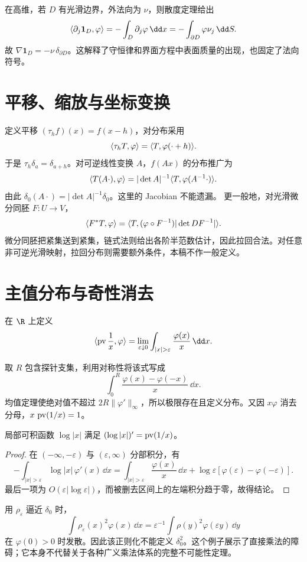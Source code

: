 在高维，若 $D$ 有光滑边界，外法向为 $\nu$，则散度定理给出
\[
 \Pair{\partial_j\mathbf1_D}{\varphi}
 =-\int_D\partial_j\varphi\,\dd x
 =-\int_{\partial D}\varphi\nu_j\,\dd S.
\]
故 $\nabla\mathbf1_D=-\nu\,\delta_{\partial D}$。这解释了守恒律和界面方程中表面质量的出现，也固定了法向符号。

\section{平移、缩放与坐标变换}
定义平移 $(\tau_hf)(x)=f(x-h)$，对分布采用
\[
 \langle \tau_hT,\varphi\rangle=\langle T,\varphi(\cdot+h)\rangle.
\]
于是 $\tau_h\delta_a=\delta_{a+h}$。对可逆线性变换 $A$，$f(Ax)$ 的分布推广为
\[
 \langle T(A\cdot),\varphi\rangle=|\det A|^{-1}\langle T,\varphi(A^{-1}\cdot)\rangle.
\]
由此 $\delta_0(A\cdot)=|\det A|^{-1}\delta_0$。这里的 Jacobian 不能遗漏。
更一般地，对光滑微分同胚 $F:U\to V$，
\[
 \langle F^*T,\varphi\rangle=\langle T,
 (\varphi\circ F^{-1})|\det DF^{-1}|\rangle.
\]
微分同胚把紧集送到紧集，链式法则给出各阶半范数估计，因此拉回合法。对任意非可逆光滑映射，拉回分布则需要额外条件，本稿不作一般定义。

\section{主值分布与奇性消去}
\begin{definition}[Cauchy 主值]
在 $\R$ 上定义
\[
 \Pair{\pv\frac1x}{\varphi}
 =\lim_{\varepsilon\downarrow0}\int_{|x|>\varepsilon}\frac{\varphi(x)}x\,\dd x.
\]
\end{definition}
取 $R$ 包含探针支集，利用对称性将该式写成
\[
 \int_0^R\frac{\varphi(x)-\varphi(-x)}x\,\dd x.
\]
均值定理使绝对值不超过 $2R\|\varphi'\|_\infty$，所以极限存在且定义分布。又因 $x\varphi$ 消去分母，$x\,\operatorname{pv}(1/x)=1$。
\begin{proposition}[对数的分布导数]
局部可积函数 $\log|x|$ 满足 $(\log|x|)'=\operatorname{pv}(1/x)$。
\end{proposition}
\begin{proof}
在 $(-\infty,-\varepsilon)$ 与 $(\varepsilon,\infty)$ 分部积分，有
\[
 -\int_{|x|>\varepsilon}\log|x|\,\varphi'(x)\,\dd x
 =\int_{|x|>\varepsilon}\frac{\varphi(x)}x\,\dd x
 +\log\varepsilon[\varphi(\varepsilon)-\varphi(-\varepsilon)].
\]
最后一项为 $O(\varepsilon|\log\varepsilon|)$，而被删去区间上的左端积分趋于零，故得结论。
\end{proof}
\begin{pitfall}[为什么不能任意相乘]
用 $\rho_\varepsilon$ 逼近 $\delta_0$ 时，
\[
 \int\rho_\varepsilon(x)^2\varphi(x)\,\dd x
 =\varepsilon^{-1}\int\rho(y)^2\varphi(\varepsilon y)\,\dd y
\]
在 $\varphi(0)>0$ 时发散。因此该正则化不能定义 $\delta_0^2$。这个例子展示了直接乘法的障碍；它本身不代替关于各种广义乘法体系的完整不可能性定理。
\end{pitfall}


